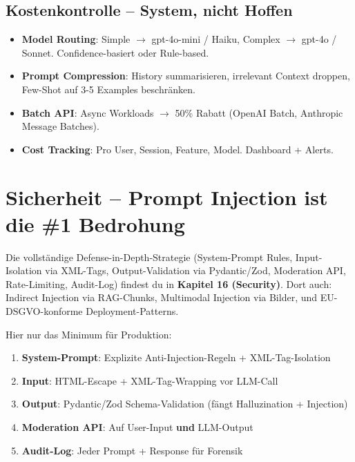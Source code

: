 \subsection{Kostenkontrolle -- System, nicht Hoffen}

\begin{itemize}[leftmargin=*]
    \item \textbf{Model Routing}: Simple $\to$ gpt-4o-mini / Haiku, Complex $\to$ gpt-4o / Sonnet. Confidence-basiert oder Rule-based.
    \item \textbf{Prompt Compression}: History summarisieren, irrelevant Context droppen, Few-Shot auf 3-5 Examples beschränken.
    \item \textbf{Batch API}: Async Workloads $\to$ 50\% Rabatt (OpenAI Batch, Anthropic Message Batches).
    \item \textbf{Cost Tracking}: Pro User, Session, Feature, Model. Dashboard + Alerts.
\end{itemize}


\section{Sicherheit -- Prompt Injection ist die \#1 Bedrohung}


Die vollständige Defense-in-Depth-Strategie (System-Prompt Rules, Input-Isolation via XML-Tags, Output-Validation via Pydantic/Zod, Moderation API, Rate-Limiting, Audit-Log) findest du in \textbf{Kapitel 16 (Security)}. Dort auch: Indirect Injection via RAG-Chunks, Multimodal Injection via Bilder, und EU-DSGVO-konforme Deployment-Patterns.

Hier nur das Minimum für Produktion:
\begin{enumerate}
    \item \textbf{System-Prompt}: Explizite Anti-Injection-Regeln + XML-Tag-Isolation
    \item \textbf{Input}: HTML-Escape + XML-Tag-Wrapping vor LLM-Call
    \item \textbf{Output}: Pydantic/Zod Schema-Validation (fängt Halluzination + Injection)
    \item \textbf{Moderation API}: Auf User-Input \textbf{und} LLM-Output
    \item \textbf{Audit-Log}: Jeder Prompt + Response für Forensik
\end{enumerate}

